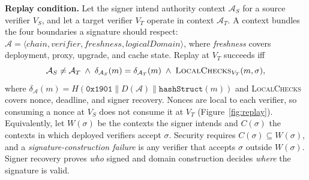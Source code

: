 \documentclass[10pt,conference]{IEEEtran}
\begin{document}
\textbf{Replay condition.} 
Let the signer intend authority context $\mathcal{A}_S$ for a source verifier $V_S$, and let a target verifier $V_T$ operate in context $\mathcal{A}_T$. A context bundles the four boundaries a signature should respect: $\mathcal{A}=\langle \mathit{chain},\mathit{verifier},\mathit{freshness},\mathit{logicalDomain}\rangle$, where \emph{freshness} covers deployment, proxy, upgrade, and cache state. Replay at $V_T$ succeeds iff
\begin{equation}
\label{eq:failure}
\mathcal{A}_S\neq\mathcal{A}_T\;\land\;\delta_{\mathcal{A}_S}(m)=\delta_{\mathcal{A}_T}(m)\;\land\;\textsc{LocalChecks}_{V_T}(m,\sigma),
\end{equation}
where $\delta_{\mathcal{A}}(m)=H(\texttt{0x1901}\parallel D(\mathcal{A})\parallel\texttt{hashStruct}(m))$ and \textsc{LocalChecks} covers nonce, deadline, and signer recovery. Nonces are local to each verifier, so consuming a nonce at $V_S$ does not consume it at $V_T$ (Figure~\ref{fig:replay}). Equivalently, let $W(\sigma)$ be the contexts the signer intends and $C(\sigma)$ the contexts in which deployed verifiers accept $\sigma$. Security requires $C(\sigma)\subseteq W(\sigma)$, and a \emph{signature-construction failure} is any verifier that accepts $\sigma$ outside $W(\sigma)$. Signer recovery proves \emph{who} signed and domain construction decides \emph{where} the signature is valid.
\end{document}
